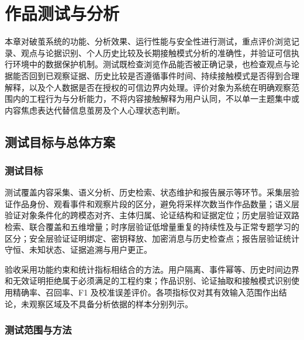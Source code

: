 \FloatBarrier\clearpage

\section{作品测试与分析}\label{chapter:3}

本章对破茧系统的功能、分析效果、运行性能与安全性进行测试，重点评价浏览记录、观点与论据识别、个人历史比较及长期接触模式分析的准确性，并验证可信执行环境中的数据保护机制。测试既检查浏览作品能否被正确记录，也检查观点与论据能否回到已观察证据、历史比较是否遵循事件时间、持续接触模式是否得到合理解释，以及个人数据是否在授权的可信边界内处理。评价对象为系统在明确观察范围内的工程行为与分析能力，不将内容接触解释为用户认同，不以单一主题集中或内容焦虑表达代替信息茧房及个人心理状态判断。

\subsection{测试目标与总体方案}\label{section:3.1}

\subsubsection{测试目标}\label{section:3.1.1}

测试覆盖内容采集、语义分析、历史检索、状态维护和报告展示等环节。采集层验证作品身份、观看事件和观察片段的区分，避免将采样次数当作作品数量；语义层验证对象条件化的跨模态对齐、主体归属、论证结构和证据定位；历史层验证双路检索、联合覆盖和五维增量；时序层验证低增量重复的持续性及与正常专题学习的区分；安全层验证证明绑定、密钥释放、加密消息与历史检查点；报告层验证统计守恒、未知状态、证据追溯与用户更正。

验收采用功能约束和统计指标相结合的方法。用户隔离、事件幂等、历史时间边界和无效证明拒绝属于必须满足的工程约束；作品识别、论证抽取和接触模式识别使用精确率、召回率、F1 及校准误差评价。各项指标仅对其有效输入范围作出结论，未观察区域及不具备分析依据的样本分别列示。

\subsubsection{测试范围与方法}\label{section:3.1.2}

